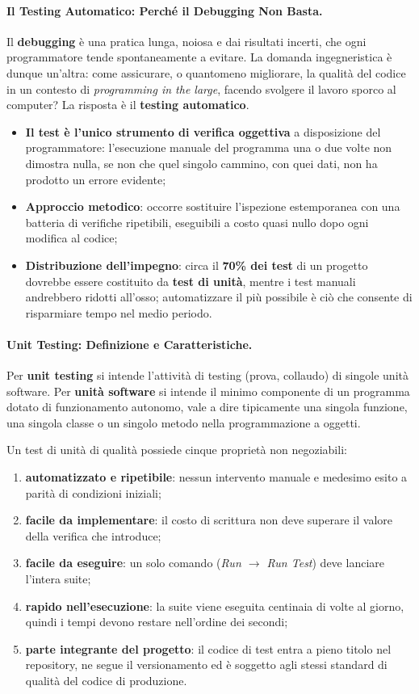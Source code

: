 \documentclass[12pt]{extarticle}
\begin{document}
\paragraph{Il Testing Automatico: Perché il Debugging Non Basta.}
Il \textbf{debugging} è una pratica lunga, noiosa e dai risultati incerti, che ogni programmatore tende spontaneamente a evitare. La domanda ingegneristica è dunque un'altra: come assicurare, o quantomeno migliorare, la qualità del codice in un contesto di \textit{programming in the large}, facendo svolgere il lavoro sporco al computer? La risposta è il \textbf{testing automatico}.
\begin{itemize}
    \item \textbf{Il test è l'unico strumento di verifica oggettiva} a disposizione del programmatore: l'esecuzione manuale del programma una o due volte non dimostra nulla, se non che quel singolo cammino, con quei dati, non ha prodotto un errore evidente;
    \item \textbf{Approccio metodico}: occorre sostituire l'ispezione estemporanea con una batteria di verifiche ripetibili, eseguibili a costo quasi nullo dopo ogni modifica al codice;
    \item \textbf{Distribuzione dell'impegno}: circa il \textbf{70\% dei test} di un progetto dovrebbe essere costituito da \textbf{test di unità}, mentre i test manuali andrebbero ridotti all'osso; automatizzare il più possibile è ciò che consente di risparmiare tempo nel medio periodo.
\end{itemize}

\paragraph{Unit Testing: Definizione e Caratteristiche.}
Per \textbf{unit testing} si intende l'attività di testing (prova, collaudo) di singole unità software. Per \textbf{unità software} si intende il minimo componente di un programma dotato di funzionamento autonomo, vale a dire tipicamente una singola funzione, una singola classe o un singolo metodo nella programmazione a oggetti.

\noindent Un test di unità di qualità possiede cinque proprietà non negoziabili:
\begin{enumerate}
    \item \textbf{automatizzato e ripetibile}: nessun intervento manuale e medesimo esito a parità di condizioni iniziali;
    \item \textbf{facile da implementare}: il costo di scrittura non deve superare il valore della verifica che introduce;
    \item \textbf{facile da eseguire}: un solo comando (\textit{Run $\to$ Run Test}) deve lanciare l'intera suite;
    \item \textbf{rapido nell'esecuzione}: la suite viene eseguita centinaia di volte al giorno, quindi i tempi devono restare nell'ordine dei secondi;
    \item \textbf{parte integrante del progetto}: il codice di test entra a pieno titolo nel repository, ne segue il versionamento ed è soggetto agli stessi standard di qualità del codice di produzione.
\end{enumerate}
\end{document}
